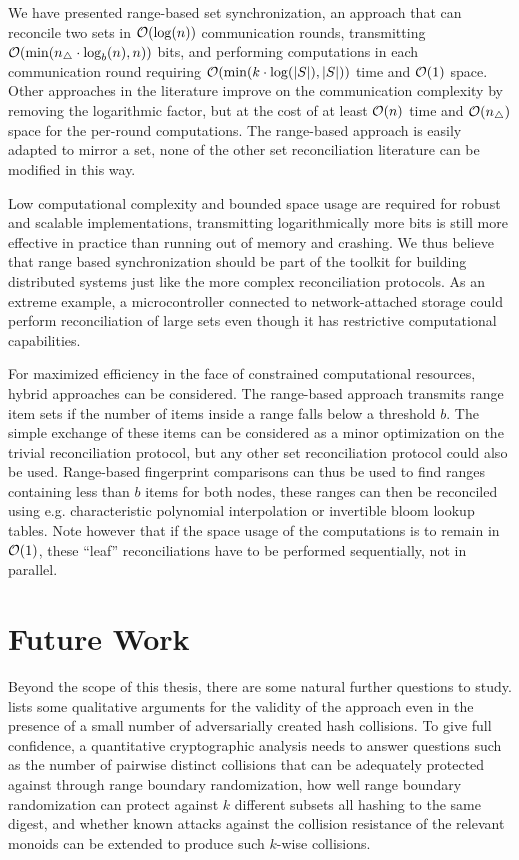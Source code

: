 
We have presented range-based set synchronization, an approach that can reconcile two sets in $\mathcal{O}(\log(n))$ communication rounds, transmitting $\mathcal{O}(\min(n_{\triangle} \cdot \log_b(n), n))$ bits, and performing computations in each communication round requiring $\mathcal{O}(\min(k \cdot \log(|{S}|), |{S}|))$ time and $\mathcal{O}(1)$ space. Other approaches in the literature improve on the communication complexity by removing the logarithmic factor, but at the cost of at least $\mathcal{O}(n)$ time and $\mathcal{O}(n_{\triangle})$ space for the per-round computations. The range-based approach is easily adapted to mirror a set, none of the other set reconciliation literature can be modified in this way.

Low computational complexity and bounded space usage are required for robust and scalable implementations, transmitting logarithmically more bits is still more effective in practice than running out of memory and crashing. We thus believe that range based synchronization should be part of the toolkit for building distributed systems just like the more complex reconciliation protocols. As an extreme example, a microcontroller connected to network-attached storage could perform reconciliation of large sets even though it has restrictive computational capabilities.

For maximized efficiency in the face of constrained computational resources, hybrid approaches can be considered. The range-based approach transmits range item sets if the number of items inside a range falls below a threshold $b$. The simple exchange of these items can be considered as a minor optimization on the trivial reconciliation protocol, but any other set reconciliation protocol could also be used. Range-based fingerprint comparisons can thus be used to find ranges containing less than $b$ items for both nodes, these ranges can then be reconciled using e.g. characteristic polynomial interpolation or invertible bloom lookup tables. Note however that if the space usage of the computations is to remain in $\mathcal{O}(1)$, these ``leaf'' reconciliations have to be performed sequentially, not in parallel.

\section{Future Work}

Beyond the scope of this thesis, there are some natural further questions to study.  lists some qualitative arguments for the validity of the approach even in the presence of a small number of adversarially created hash collisions. To give full confidence, a quantitative cryptographic analysis needs to answer questions such as the number of pairwise distinct collisions that can be adequately protected against through range boundary randomization, how well range boundary randomization can protect against $k$ different subsets all hashing to the same digest, and whether known attacks against the collision resistance of the relevant monoids can be extended to produce such $k$-wise collisions.

